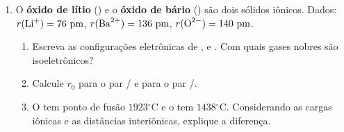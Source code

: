 \documentclass[10pt,a4paper]{article}
\newcommand{\oC}{$^\circ$C}
\begin{document}
\begin{enumerate}[resume]
\item O \textbf{óxido de lítio} () e o
  \textbf{óxido de bário} () são dois sólidos iônicos.
  Dados:
  $r(\ce{Li^+}) = 76~\text{pm}$,
  $r(\ce{Ba^{2+}}) = 136~\text{pm}$,
  $r(\ce{O^{2-}}) = 140~\text{pm}$.
  \begin{enumerate}
    \item Escreva as configurações eletrônicas de
          ,  e .
          Com quais gases nobres são isoeletrônicos?
    \item Calcule $r_0$ para o par /
          e para o par /.
    \item O  tem ponto de fusão $1923$\oC{} e o
           tem $1438$\oC. Considerando as cargas
          iônicas e as distâncias interiônicas, explique
          a diferença.
  \end{enumerate}

\end{enumerate}
\end{document}
